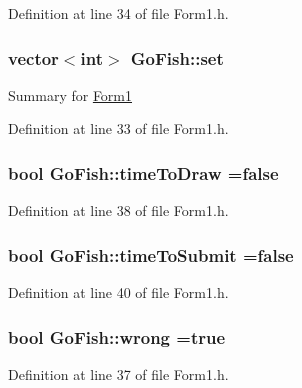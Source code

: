 Definition at line 34 of file Form1.\+h.

\hypertarget{namespace_go_fish_a0516ae63daeafe7d734fd0e380a5cd24}{
\subsubsection[{set}]{\setlength{\rightskip}{0pt plus 5cm}vector$<$int$>$ Go\+Fish\+::set}}\label{namespace_go_fish_a0516ae63daeafe7d734fd0e380a5cd24}
Summary for \hyperlink{class_go_fish_1_1_form1}{Form1} 

Definition at line 33 of file Form1.\+h.

\hypertarget{namespace_go_fish_a76b216755d7556d9ee96ca7ae0fa620d}{
\subsubsection[{time\+To\+Draw}]{\setlength{\rightskip}{0pt plus 5cm}bool Go\+Fish\+::time\+To\+Draw =false}}\label{namespace_go_fish_a76b216755d7556d9ee96ca7ae0fa620d}


Definition at line 38 of file Form1.\+h.

\hypertarget{namespace_go_fish_af285f106abe3d068160690d582c4ec70}{
\subsubsection[{time\+To\+Submit}]{\setlength{\rightskip}{0pt plus 5cm}bool Go\+Fish\+::time\+To\+Submit =false}}\label{namespace_go_fish_af285f106abe3d068160690d582c4ec70}


Definition at line 40 of file Form1.\+h.

\hypertarget{namespace_go_fish_a5ef343351958e4a4c45cfa2d0aa895b5}{
\subsubsection[{wrong}]{\setlength{\rightskip}{0pt plus 5cm}bool Go\+Fish\+::wrong =true}}\label{namespace_go_fish_a5ef343351958e4a4c45cfa2d0aa895b5}


Definition at line 37 of file Form1.\+h.

